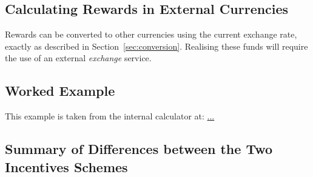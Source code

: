 \documentclass[11pt,a4paper,dvipsnames,twosided,final]{article}
\begin{document}
\subsection{Calculating Rewards in External Currencies}

Rewards can be converted to other currencies using the current exchange rate, exactly as described in
Section~\ref{sec:conversion}.  Realising these funds will require the use of an external \emph{exchange} service.

\clearpage
\subsection{Worked Example}

This example is taken from the \IOHK{} internal calculator at:
\url{...}


\clearpage
\subsection{Summary of Differences between the Two Incentives Schemes}
\label{sec:summary}
\end{document}
